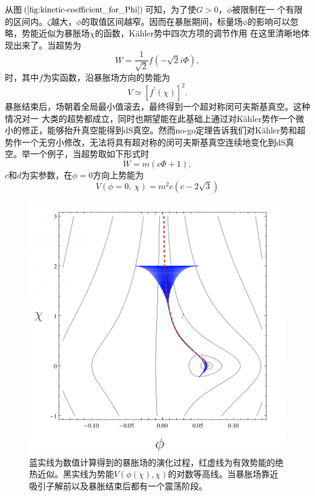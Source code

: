 从图$(\ref{fig:kinetic-coefficient_for_Phi})$可知，为了使$G>0$，$\phi$被限制在一
个有限的区间内。$\zeta$越大，$\phi$的取值区间越窄。因而在暴胀期间，标量场$\phi$的影响可以忽略，势能近似为暴胀场$\chi$的函数，K\"ahler势中四次方项的调节作用
在这里清晰地体现出来了。当超势为
\begin{equation}
  W = \frac{1}{\sqrt{2}} f(-\sqrt{2}i\Phi),
\end{equation}
时，其中$f$为实函数，沿暴胀场方向的势能为
\begin{equation}
  V\simeq {\left[f^\prime(\chi)\right]}^2.
\end{equation}
暴胀结束后，场朝着全局最小值滚去，最终得到一个超对称闵可夫斯基真空。这种情况对一
大类的超势都成立，同时也期望能在此基础上通过对K\"ahler势作一个微小的修正，能够抬升真空能得到dS真空。然而no-go定理\citep{kallosh2014analytic}告诉我们对K\"ahler势和超势作一个无穷小修改，无法将具有超对称的闵可夫斯基真空连续地变化到dS真空。举一个例子，当超势取如下形式时
\begin{equation}
  W=m(c\Phi+1),  
\end{equation}
$c$和$d$为实参数，在$\phi=0$方向上势能为
\begin{equation}
  V(\phi=0,\ \chi)=m^2c(c-2\sqrt{3}) 
\end{equation}
\begin{figure}
  \centering
  \includegraphics[width=5in]{Img/potential-for-linear-superpotential.png}
  \caption{蓝实线为数值计算得到的暴胀场的演化过程，红虚线为有效势能的绝热近似。黑实线为势能$V(\phi(\chi),
  \chi)$的对数等高线。当暴胀场靠近吸引子解前以及暴胀结束后都有一个震荡阶段。}\label{fig:potential-for-linear-superpotential}
\end{figure}
